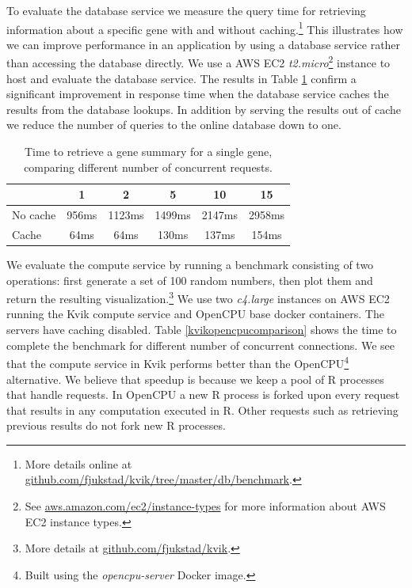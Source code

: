 To evaluate the database service we measure the query time for retrieving
information about a specific gene with and without caching.\footnote{More
details online at \url{github.com/fjukstad/kvik/tree/master/db/benchmark}.} This
illustrates how we can improve performance in an application by using a database
service rather than accessing the database directly. 
We use a AWS EC2 \emph{t2.micro}\footnote{See
\url{aws.amazon.com/ec2/instance-types} for more information about AWS EC2
instance types.} instance to host and evaluate the database service.  The
results in Table \ref{db} confirm a significant improvement in response time
when the database service caches the results from the database lookups. In
addition by serving the results out of cache we reduce the number of queries to
the online database down to one. 

\begin{table}[h]
    \caption{Time to retrieve a gene summary for a single gene, comparing
    different number of concurrent requests.}
    \begin{tabular}{| l | c | c | c | c | c | }
        \hline 
        & 1 & 2 & 5 & 10 & 15 \\ 
      \hline			
      No cache & 956ms & 1123ms & 1499ms & 2147ms & 2958ms\\
      \hline
      Cache & 64ms & 64ms & 130ms & 137ms & 154ms\\
      \hline  
    \end{tabular}
\label{db}
\end{table} 

We evaluate the compute service by running a benchmark consisting of two
operations: first generate a set of 100 random numbers, then plot them and
return the resulting visualization.\footnote{More details at
\url{github.com/fjukstad/kvik}.} We use two \emph{c4.large} instances on AWS EC2
running the Kvik compute service and OpenCPU base docker containers. The servers
have caching disabled.  Table \ref{kvikopencpucomparison} shows the time to
complete the benchmark for different number of concurrent connections. We see
that the compute service in Kvik performs better than the OpenCPU\footnote{Built
using the \textit{opencpu-server} Docker image.} alternative. We believe that
speedup is because we keep a pool of R processes that handle requests. In
OpenCPU a new R process is forked upon every request that results in any
computation executed in R. Other requests such as retrieving previous results do
not fork new R processes. 

